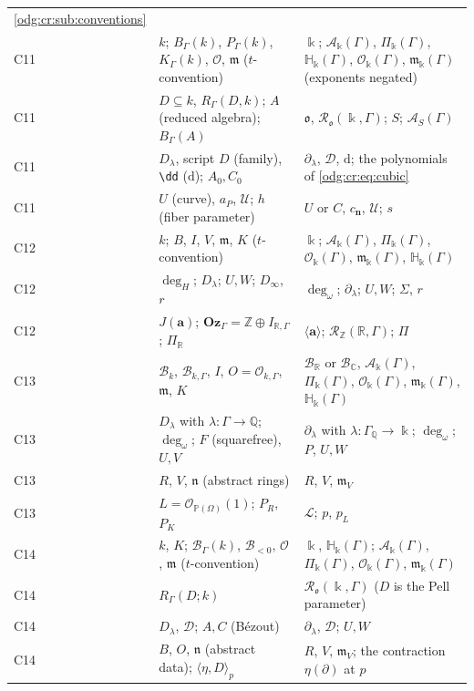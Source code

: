 \documentclass[11pt,oneside]{article}
\numberwithin{equation}{section}
\theoremstyle{definition}
\theoremstyle{remark}
\newcommand{\Oz}{\mathbf{Oz}}
\newcommand{\Z}{\mathbb Z}
\newcommand{\Q}{\mathbb Q}
\newcommand{\R}{\mathbb R}
\newcommand{\C}{\mathbb C}
\newcommand{\BR}{\mathcal B_{\R}}
\newcommand{\BC}{\mathcal B_{\C}}
\newcommand{\ddeg}{\operatorname{deg}_{\omega}}
\newcommand{\crH}{\mathbb H_\Bbbk(\Gamma)}
\newcommand{\crA}{\mathcal A_\Bbbk(\Gamma)}
\newcommand{\crP}{\Pi_\Bbbk(\Gamma)}
\newcommand{\crO}{\mathcal O_\Bbbk(\Gamma)}
\newcommand{\crm}{\mathfrak m_\Bbbk(\Gamma)}
\newcommand{\dif}{\mathrm d}
\begin{document}
\begin{longtable}{>{\raggedright\arraybackslash}p{}>{\raggedright\arraybackslash}p{}>{\raggedright\arraybackslash}p{}}
\cref{odg:cr:sub:conventions}\\
C11 & $k$; $B_\Gamma(k)$, $P_\Gamma(k)$, $K_\Gamma(k)$, $\mathcal O$, $\mathfrak m$
($t$-convention) & $\Bbbk$; $\crA$, $\crP$, $\crH$, $\crO$, $\crm$ (exponents
negated)\\
C11 & $D\subseteq k$, $R_\Gamma(D,k)$; $A$ (reduced algebra); $B_\Gamma(A)$ &
$\mathfrak o$, $\mathcal R_{\mathfrak o}(\Bbbk,\Gamma)$; $S$; $\mathcal A_S(\Gamma)$\\
C11 & $D_\lambda$, script $D$ (family), \texttt{\textbackslash dd} ($\mathrm d$); $A_0,C_0$ &
$\partial_\lambda$, $\mathcal D$, $\dif$; the polynomials of \eqref{odg:cr:eq:cubic}\\
C11 & $U$ (curve), $a_P$, $\mathcal U$; $h$ (fiber parameter) & $U$ or $C$,
$c_{\mathbf n}$, $\mathcal U$; $s$\\
C12 & $k$; $B$, $I$, $V$, $\mathfrak m$, $K$ ($t$-convention) & $\Bbbk$; $\crA$,
$\crP$, $\crO$, $\crm$, $\crH$\\
C12 & $\deg_H$; $D_\lambda$; $U,W$; $D_\infty$, $r$ & $\ddeg$; $\partial_\lambda$;
$U,W$; $\Sigma$, $r$\\
C12 & $J(\mathbf a)$; $\Oz_\Gamma=\Z\oplus I_{\R,\Gamma}$; $\Pi_\R$ &
$\langle\mathbf a\rangle$; $\mathcal R_\Z(\R,\Gamma)$; $\Pi$\\
C13 & $\mathcal B_k$, $\mathcal B_{k,\Gamma}$, $I$, $O=\mathcal O_{k,\Gamma}$,
$\mathfrak m$, $K$ & $\BR$ or $\BC$, $\crA$, $\crP$, $\crO$, $\crm$, $\crH$\\
C13 & $D_\lambda$ with $\lambda:\Gamma\to\Q$; $\deg_\omega$; $F$ (squarefree), $U,V$ &
$\partial_\lambda$ with $\lambda:\Gamma_\Q\to\Bbbk$; $\ddeg$; $P$, $U,W$\\
C13 & $R$, $V$, $\mathfrak n$ (abstract rings) & $R$, $V$, $\mathfrak m_V$\\
C13 & $L=\mathcal O_{\mathbb P(\Omega)}(1)$; $P_R$, $P_K$ & $\mathcal L$; $p$, $p_L$\\
C14 & $k$, $K$; $\mathcal B_\Gamma(k)$, $\mathcal B_{<0}$, $\mathcal O$, $\mathfrak m$
($t$-convention) & $\Bbbk$, $\crH$; $\crA$, $\crP$, $\crO$, $\crm$\\
C14 & $R_\Gamma(D;k)$ & $\mathcal R_{\mathfrak o}(\Bbbk,\Gamma)$ ($D$ is the Pell
parameter)\\
C14 & $D_\lambda$, $\mathcal D$; $A,C$ (B\'ezout) & $\partial_\lambda$, $\mathcal D$;
$U,W$\\
C14 & $B$, $O$, $\mathfrak n$ (abstract data); $\langle\eta,D\rangle_p$ & $R$, $V$,
$\mathfrak m_V$; the contraction $\eta(\partial)$ at $p$\\

\end{longtable}
\end{document}
